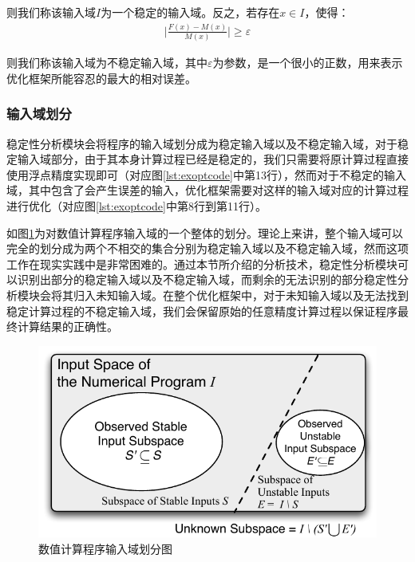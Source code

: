 则我们称该输入域$I$为一个稳定的输入域。反之，若存在$x \in I$，使得：
\begin{align*}
  \Big|\frac{F(x)-M(x)}{M(x)}\Big| \geq \varepsilon
\end{align*}

则我们称该输入域为不稳定输入域，其中$\varepsilon$为参数，是一个很小的正数，用来表示优化框架所能容忍的最大的相对误差。

\subsubsection{输入域划分}

稳定性分析模块会将程序的输入域划分成为稳定输入域以及不稳定输入域，对于稳定输入域部分，由于其本身计算过程已经是稳定的，我们只需要将原计算过程直接使用浮点精度实现即可（对应图\ref{lst:exoptcode}中第13行），然而对于不稳定的输入域，其中包含了会产生误差的输入，优化框架需要对这样的输入域对应的计算过程进行优化（对应图\ref{lst:exoptcode}中第8行到第11行）。

如图\ref{fig:inputspace}为对数值计算程序输入域的一个整体的划分。理论上来讲，整个输入域可以完全的划分成为两个不相交的集合分别为稳定输入域以及不稳定输入域，然而这项工作在现实实践中是非常困难的。通过本节所介绍的分析技术，稳定性分析模块可以识别出部分的稳定输入域以及不稳定输入域，而剩余的无法识别的部分稳定性分析模块会将其归入未知输入域。在整个优化框架中，对于未知输入域以及无法找到稳定计算过程的不稳定输入域，我们会保留原始的任意精度计算过程以保证程序最终计算结果的正确性。

\begin{figure}[tb]
  \centering
  \includegraphics[width=\columnwidth]{fig/InputSpace.pdf}
  \vspace*{1mm}
  \caption{数值计算程序输入域划分图} \label{fig:inputspace} %
\end{figure}

